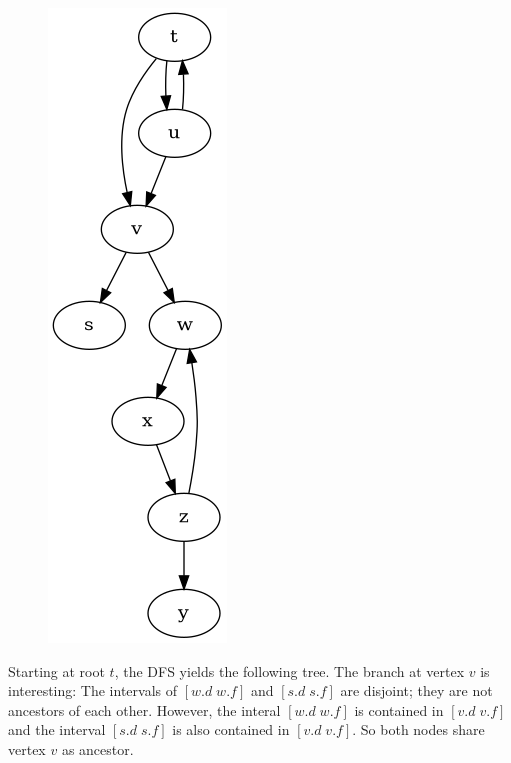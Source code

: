 \begin{figure}[H]
\centering
\includegraphics[scale=0.4]{images/dfs_04.png}
\end{figure}

Starting at root $t$, the DFS yields the following tree. The branch at vertex $v$ is interesting: The intervals of $[w.d \; w.f]$ and $[s.d \; s.f]$ are disjoint; they are not ancestors of each other. However, the interal $[w.d \; w.f]$ is contained in $[v.d \; v.f]$ and the interval $[s.d \; s.f]$ is also contained in $[v.d \; v.f]$. So both nodes share vertex $v$ as ancestor.

